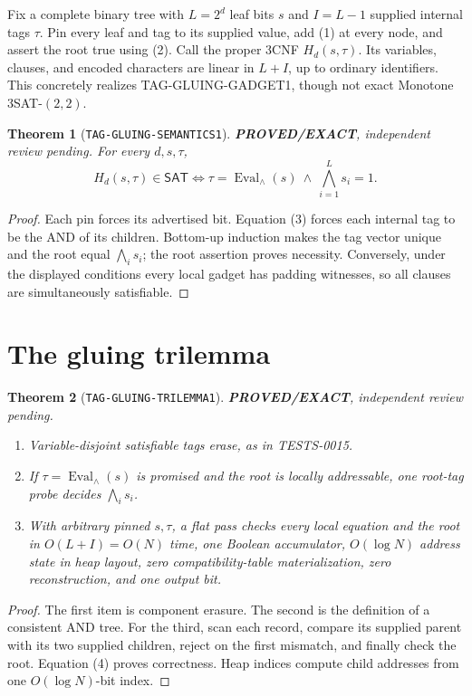 \documentclass[11pt]{article}
\newtheorem{theorem}{Theorem}
\newcommand{\SAT}{\mathsf{SAT}}
\newcommand{\EXACT}{\textbf{PROVED/EXACT}}
\begin{document}
Fix a complete binary tree with \(L=2^d\) leaf bits \(s\) and \(I=L-1\)
supplied internal tags \(\tau\).  Pin every leaf and tag to its supplied value,
add (1) at every node, and assert the root true using (2).  Call the proper
3CNF \(H_d(s,\tau)\).  Its variables, clauses, and encoded characters are
linear in \(L+I\), up to ordinary identifiers.  This concretely realizes
TAG-GLUING-GADGET1, though not exact Monotone 3SAT-\((2,2)\).

\begin{theorem}[\texttt{TAG-GLUING-SEMANTICS1}]
\EXACT, independent review pending.  For every \(d,s,\tau\),
\[
H_d(s,\tau)\in\SAT
\Longleftrightarrow
\tau=\operatorname{Eval}_{\wedge}(s)
\ \land\ \bigwedge_{i=1}^{L}s_i=1.
\tag{4}
\]
\end{theorem}
\begin{proof}
Each pin forces its advertised bit.  Equation (3) forces each internal tag to
be the AND of its children.  Bottom-up induction makes the tag vector unique
and the root equal \(\bigwedge_i s_i\); the root assertion proves necessity.
Conversely, under the displayed conditions every local gadget has padding
witnesses, so all clauses are simultaneously satisfiable.
\end{proof}

\section{The gluing trilemma}

\begin{theorem}[\texttt{TAG-GLUING-TRILEMMA1}]
\EXACT, independent review pending.
\begin{enumerate}
\item Variable-disjoint satisfiable tags erase, as in TESTS-0015.
\item If \(\tau=\operatorname{Eval}_{\wedge}(s)\) is promised and the root is
locally addressable, one root-tag probe decides \(\bigwedge_i s_i\).
\item With arbitrary pinned \(s,\tau\), a flat pass checks every local
equation and the root in \(O(L+I)=O(N)\) time, one Boolean accumulator,
\(O(\log N)\) address state in heap layout, zero compatibility-table
materialization, zero reconstruction, and one output bit.
\end{enumerate}
\end{theorem}
\begin{proof}
The first item is component erasure.  The second is the definition of a
consistent AND tree.  For the third, scan each record, compare its supplied
parent with its two supplied children, reject on the first mismatch, and
finally check the root.  Equation (4) proves correctness.  Heap indices
compute child addresses from one \(O(\log N)\)-bit index.
\end{proof}
\end{document}

